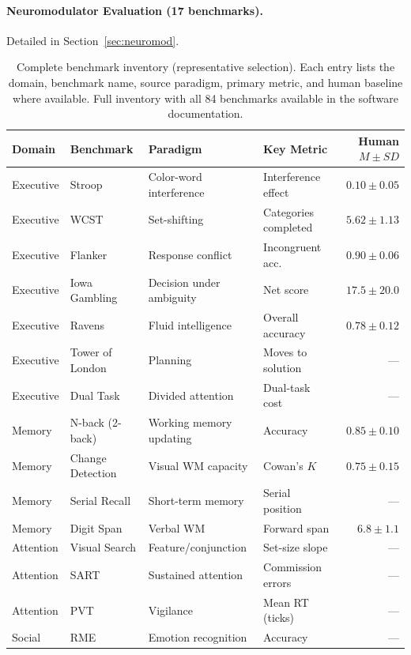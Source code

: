 \documentclass[11pt,letterpaper]{article}
\begin{document}
\paragraph{Neuromodulator Evaluation (17 benchmarks).} Detailed in Section~\ref{sec:neuromod}.

\begin{table}[p]
\centering
\caption{Complete benchmark inventory (representative selection). Each entry lists the domain, benchmark name, source paradigm, primary metric, and human baseline where available. Full inventory with all 84 benchmarks available in the software documentation.}
\label{tab:inventory}
\small
\begin{tabular}{@{}llllr@{}}
\toprule
\textbf{Domain} & \textbf{Benchmark} & \textbf{Paradigm} & \textbf{Key Metric} & \textbf{Human $M \pm SD$} \\
\midrule
Executive & Stroop & Color-word interference & Interference effect & $0.10 \pm 0.05$ \\
Executive & WCST & Set-shifting & Categories completed & $5.62 \pm 1.13$ \\
Executive & Flanker & Response conflict & Incongruent acc. & $0.90 \pm 0.06$ \\
Executive & Iowa Gambling & Decision under ambiguity & Net score & $17.5 \pm 20.0$ \\
Executive & Ravens & Fluid intelligence & Overall accuracy & $0.78 \pm 0.12$ \\
Executive & Tower of London & Planning & Moves to solution & --- \\
Executive & Dual Task & Divided attention & Dual-task cost & --- \\
\midrule
Memory & N-back (2-back) & Working memory updating & Accuracy & $0.85 \pm 0.10$ \\
Memory & Change Detection & Visual WM capacity & Cowan's $K$ & $0.75 \pm 0.15$ \\
Memory & Serial Recall & Short-term memory & Serial position & --- \\
Memory & Digit Span & Verbal WM & Forward span & $6.8 \pm 1.1$ \\
\midrule
Attention & Visual Search & Feature/conjunction & Set-size slope & --- \\
Attention & SART & Sustained attention & Commission errors & --- \\
Attention & PVT & Vigilance & Mean RT (ticks) & --- \\
\midrule
Social & RME & Emotion recognition & Accuracy & --- \\

\end{tabular}
\end{table}
\end{document}
